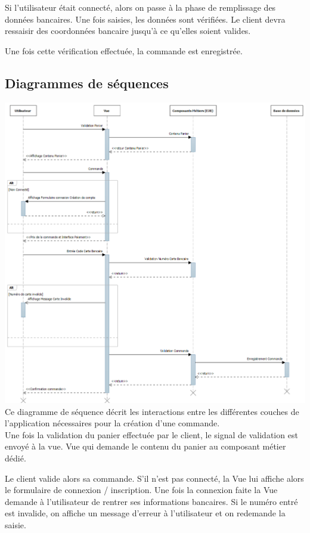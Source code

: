 	Si l'utilisateur était connecté, alors on passe à la phase de remplissage des données bancaires. Une fois saisies, les données sont vérifiées. Le client devra ressaisir des coordonnées bancaire jusqu’à ce qu'elles soient valides.

	Une fois cette vérification effectuée, la commande est enregistrée.

	\clearpage
	\subsection{Diagrammes de séquences}
	\includegraphics[scale=0.37]{Res/sequenceDiagramOrder.png}
	Ce diagramme de séquence décrit les interactions entre les différentes couches de l’application nécessaires pour la création d'une commande. \\

	Une fois la validation du panier effectuée par le client, le signal de validation est envoyé à la vue. Vue qui demande le contenu du panier au composant métier dédié.

	Le client valide alors sa commande. S'il n'est pas connecté, la Vue lui affiche alors le formulaire de connexion / inscription. Une fois la connexion faite la Vue demande à l'utilisateur de rentrer ses informations bancaires. Si le numéro entré est invalide, on affiche un message d'erreur  à l'utilisateur et on redemande la saisie.

